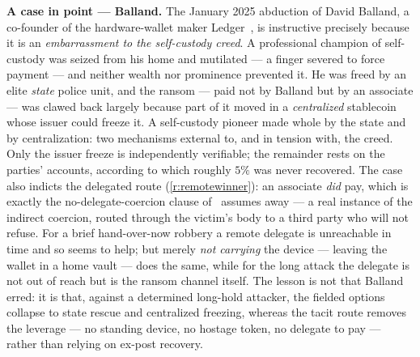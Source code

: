 \medskip\noindent\textbf{A case in point --- Balland.} The January 2025 abduction of
David Balland, a co-founder of the hardware-wallet maker Ledger~\cite{balland}, is
instructive precisely because it is an \emph{embarrassment to the self-custody creed}.
A professional champion of self-custody was seized from his home and mutilated --- a
finger severed to force payment --- and neither wealth nor prominence prevented it. He
was freed by an elite \emph{state} police unit, and the ransom --- paid not by Balland
but by an associate --- was clawed back largely because part of it moved in a
\emph{centralized} stablecoin whose issuer could freeze it. A self-custody pioneer
made whole by the state and by centralization: two mechanisms external to, and in
tension with, the creed. Only the issuer freeze is independently verifiable; the
remainder rests on the parties' accounts, according to which roughly $5\%$ was never recovered.
The case also indicts the delegated route (\ref{r:remotewinner}): an associate
\emph{did} pay, which is exactly the no-delegate-coercion clause of~\cite{deadly-race}
assumes away --- a real instance of the indirect coercion,
routed through the victim's body to a third party who will not refuse. For a brief
hand-over-now robbery a remote delegate is unreachable in time and so seems to help;
but merely \emph{not carrying} the device --- leaving the wallet in a home vault ---
does the same, while for the long attack the delegate is not out of reach but is the
ransom channel itself. The lesson is not that Balland erred: it is that, against a
determined long-hold attacker, the fielded options collapse to state rescue and
centralized freezing, whereas the tacit route removes the leverage --- no standing
device, no hostage token, no delegate to pay --- rather than relying on ex-post
recovery.

